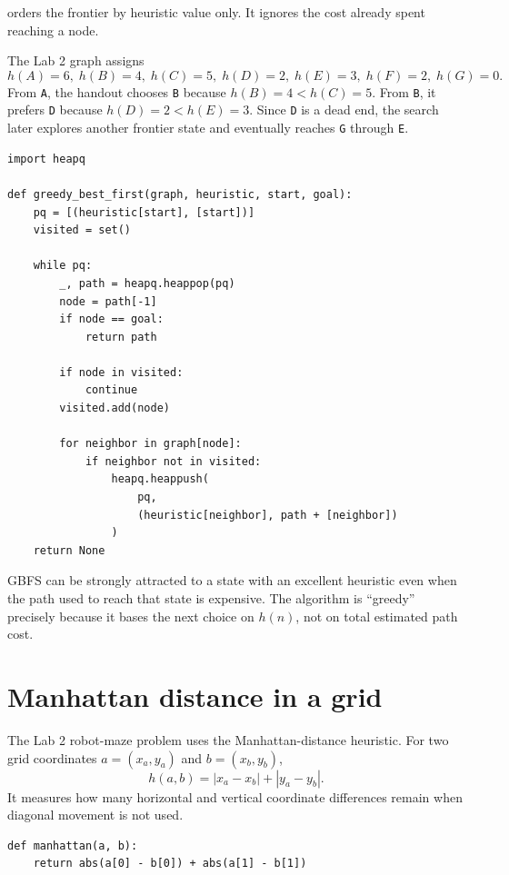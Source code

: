  orders the frontier by heuristic value only. It ignores the cost already spent reaching a node.

The Lab 2 graph assigns
\[
h(A)=6,\; h(B)=4,\; h(C)=5,\; h(D)=2,\; h(E)=3,\; h(F)=2,\; h(G)=0.
\]
From \texttt{A}, the handout chooses \texttt{B} because \(h(B)=4<h(C)=5\). From \texttt{B}, it prefers \texttt{D} because \(h(D)=2<h(E)=3\). Since \texttt{D} is a dead end, the search later explores another frontier state and eventually reaches \texttt{G} through \texttt{E}.

\begin{lstlisting}[style=mlpython]
import heapq

def greedy_best_first(graph, heuristic, start, goal):
    pq = [(heuristic[start], [start])]
    visited = set()

    while pq:
        _, path = heapq.heappop(pq)
        node = path[-1]
        if node == goal:
            return path

        if node in visited:
            continue
        visited.add(node)

        for neighbor in graph[node]:
            if neighbor not in visited:
                heapq.heappush(
                    pq,
                    (heuristic[neighbor], path + [neighbor])
                )
    return None
\end{lstlisting}

\begin{pitfall}
GBFS can be strongly attracted to a state with an excellent heuristic even when the path used to reach that state is expensive. The algorithm is ``greedy'' precisely because it bases the next choice on \(h(n)\), not on total estimated path cost.
\end{pitfall}

\section{Manhattan distance in a grid}

The Lab 2 robot-maze problem uses the Manhattan-distance heuristic. For two grid coordinates \(a=(x_a,y_a)\) and \(b=(x_b,y_b)\),
\[
h(a,b)=|x_a-x_b|+|y_a-y_b|.
\]
It measures how many horizontal and vertical coordinate differences remain when diagonal movement is not used.

\begin{lstlisting}[style=mlpython]
def manhattan(a, b):
    return abs(a[0] - b[0]) + abs(a[1] - b[1])
\end{lstlisting}

